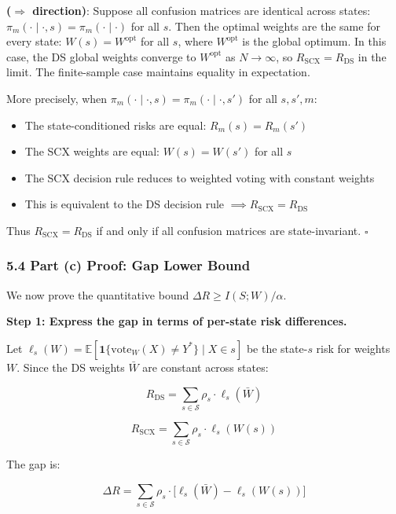 \documentclass[
  12pt,
]{ctexart}
\providecommand{\tightlist}{%
  \setlength{\itemsep}{0pt}\setlength{\parskip}{0pt}}
\begin{document}
\textbf{(\(\Rightarrow\) direction)}: Suppose all confusion matrices are
identical across states:
\(\pi_m(\cdot \mid \cdot, s) = \pi_m(\cdot \mid \cdot)\) for all \(s\).
Then the optimal weights are the same for every state:
\(W(s) = W^{\text{opt}}\) for all \(s\), where \(W^{\text{opt}}\) is the
global optimum. In this case, the DS global weights converge to
\(W^{\text{opt}}\) as \(N \to \infty\), so
\(R_{\text{SCX}} = R_{\text{DS}}\) in the limit. The finite-sample case
maintains equality in expectation.

More precisely, when
\(\pi_m(\cdot \mid \cdot, s) = \pi_m(\cdot \mid \cdot, s')\) for all
\(s, s', m\):

\begin{itemize}
\tightlist
\item
  The state-conditioned risks are equal: \(R_m(s) = R_m(s')\)
\item
  The SCX weights are equal: \(W(s) = W(s')\) for all \(s\)
\item
  The SCX decision rule reduces to weighted voting with constant weights
\item
  This is equivalent to the DS decision rule
  \(\implies R_{\text{SCX}} = R_{\text{DS}}\)
\end{itemize}

Thus \(R_{\text{SCX}} = R_{\text{DS}}\) if and only if all confusion
matrices are state-invariant. \(\square\)

\subsubsection{5.4 Part (c) Proof: Gap Lower
Bound}\label{part-c-proof-gap-lower-bound}

We now prove the quantitative bound \(\Delta R \geq I(S; W)/\alpha\).

\textbf{Step 1: Express the gap in terms of per-state risk differences.}

Let
\(\ell_s(W) = \mathbb{E}[\mathbf{1}\{\text{vote}_W(X) \neq Y^*\} \mid X \in s]\)
be the state-\(s\) risk for weights \(W\). Since the DS weights
\(\bar{W}\) are constant across states:

\[R_{\text{DS}} = \sum_{s \in \mathcal{S}} \rho_s \cdot \ell_s(\bar{W})\]

\[R_{\text{SCX}} = \sum_{s \in \mathcal{S}} \rho_s \cdot \ell_s(W(s))\]

The gap is:

\[\Delta R = \sum_{s \in \mathcal{S}} \rho_s \cdot \bigl[ \ell_s(\bar{W}) - \ell_s(W(s)) \bigr]\]
\end{document}
